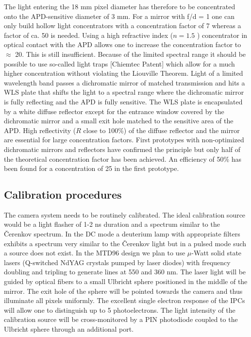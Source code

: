 The light entering the 18 mm pixel diameter has therefore to be concentrated
onto the APD-sensitive diameter of 3 mm. For a mirror with f/d = 1 one can
only build hollow light concentrators with a concentration factor of 7
whereas a factor of ca. 50 is needed. Using a high refractive index ($n=1.5$%
) concentrator in optical contact with the APD allows one to increase the
concentration factor to $\approx $ 20. This is still insufficient. Because
of the limited spectral range it should be possible to use so-called light
traps [Chiemtec Patent] which allow for a much higher concentration without
violating the Liouville Theorem. Light of a limited wavelength band passes a
dichromatic mirror of matched transmission and hits a WLS plate that shifts the
light to a spectral range where the dichromatic mirror is fully reflecting and
the APD is fully sensitive. The WLS plate is encapsulated by a white diffuse
reflector except for the entrance window covered by the dichromatic mirror and
a small exit hole matched to the sensitive area of the APD. High
reflectivity ($R$ close to 100\%) of the diffuse reflector and the mirror
are essential for large concentration factors. First prototypes with
non-optimized dichromatic mirrors and reflectors have confirmed the principle
but only half of the theoretical concentration factor has been achieved. An
efficiency of 50\% has been found for a concentration of 25 in the first
prototype.

\subsection{Calibration procedures}


\medskip The camera system needs to be routinely calibrated. The ideal
calibration source would be a light flasher of 1-2 ns duration and a
spectrum similar to the \v{C}erenkov spectrum. In the DC mode a deuterium lamp
with appropriate filters exhibits a spectrum very similar to the \v{C}erenkov
light but in a pulsed mode such a source does not exist. In the MTD96 design
we plan to use $\mu $-Watt solid state lasers (Q-switched NdYAG crystals
pumped by laser diodes) with frequency doubling and tripling to generate
lines at 550 and 360 nm. The laser light will be guided by optical fibers to
a small Ulbricht sphere positioned in the middle of the mirror. The exit
hole of the sphere will be pointed towards the camera and thus illuminate
all pixels uniformly. The excellent single electron response of the IPCs
will allow one to distinguish up to 5 photoelectrons. The light intensity of
the calibration source will be cross-monitored by a PIN photodiode coupled
to the Ulbricht sphere through an additional port.

